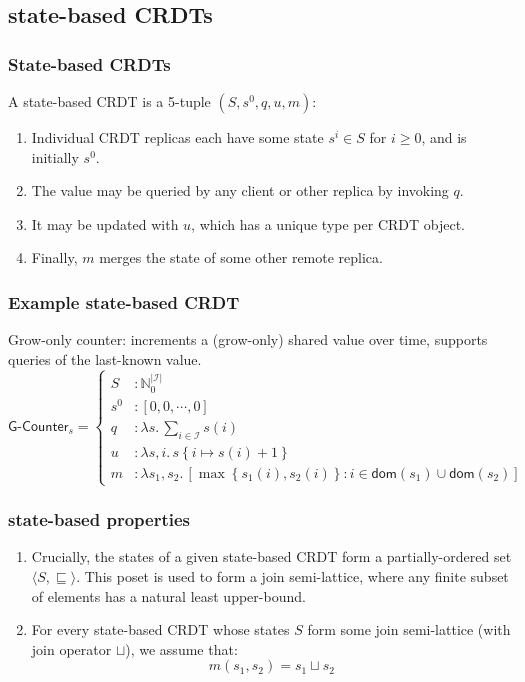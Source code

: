 \documentclass[aspectratio=169,compress,handout]{beamer}
\newcommand*{\CRDT}{\textsf{CRDT}\xspace}
\newcommand*{\CRDTs}{\textsf{CRDTs}\xspace}
\begin{document}
  \subsection{state-based \CRDTs}
  \begin{frame}
    \frametitle{State-based \CRDTs}

    A state-based \CRDT is a 5-tuple $(S, s^0, q, u, m)$:
    \begin{enumerate}
      \item Individual \CRDT replicas each have some state $s^i \in S$ for $i
        \ge 0$, and is initially $s^0$.
      \item The value may be queried by any client or other replica by invoking
        $q$.
      \item It may be updated with $u$, which has a unique type per \CRDT
        object.
      \item Finally, $m$ merges the state of some other remote replica.
    \end{enumerate}
  \end{frame}

  \begin{frame}
    \frametitle{Example state-based \CRDT}

    Grow-only counter: increments a (grow-only) shared value over time, supports
    queries of the last-known value.
    \[
      \textsf{G-Counter}_s = \left\{\begin{aligned}
        S &: \mathbb{N}_0^{|\mathcal{I}|} \\
        s^0 &: \left[ 0, 0, \cdots, 0 \right] \\
        q &: \lambda s.\, \sum_{i \in \mathcal{I}} s(i) \\
        u &: \lambda s,i.\, s\left\{ i \mapsto s(i) + 1 \right\} \\
        m &: \lambda s_1, s_2.\, \left[ \max\left\{ s_1(i), s_2(i) \right\}: i \in \mathsf{dom}(s_1) \cup
        \mathsf{dom}(s_2) \right]
      \end{aligned}\right.
    \]
  \end{frame}

  \begin{frame}
    \frametitle{state-based properties}

    \begin{enumerate}[<+->]
      \item Crucially, the states of a given state-based \CRDT form a
        partially-ordered set $\langle S, \sqsubseteq \rangle$. This poset is
        used to form a join semi-lattice, where any finite subset of elements
        has a natural least upper-bound.

      \item For every state-based \CRDT whose states $S$ form some join
        semi-lattice (with join operator $\sqcup$), we assume that:
        \[
          m(s_1, s_2) = s_1 \sqcup s_2
        \]
    \end{enumerate}
  \end{frame}
\end{document}
